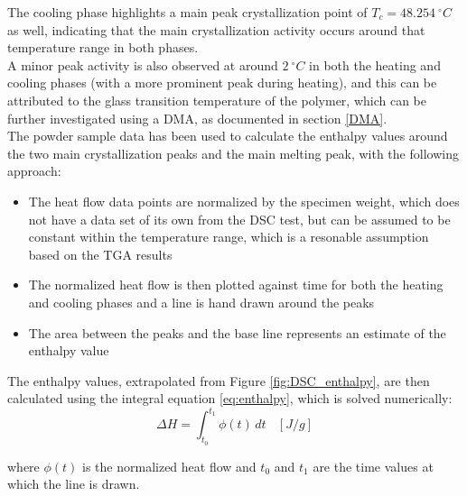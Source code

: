 \documentclass[a4paper]{article}
\begin{document}
        The cooling phase highlights a main peak crystallization point of $T_{c} =  48.254 \ ^{\circ}C$ as well, indicating 
        that the main crystallization activity occurs around that temperature range in both phases. \\ 

        A minor peak activity is also observed at around $2 \ ^{\circ}C$ in both the heating and cooling phases
        (with a more prominent peak during heating), and this can be attributed to the
        glass transition temperature of the polymer, which can be further investigated using a DMA, as documented in section \ref{DMA}. \\

        The powder sample data has been used to calculate the enthalpy values around the two main crystallization peaks and the main 
        melting peak, with the following approach: \\

        \begin{itemize}
            \item The heat flow data points are normalized by the specimen weight, which does not have a data set of its own from the DSC test, 
            but can be assumed to be constant within the temperature range, which is a resonable 
            assumption based on the TGA results 
            \item The normalized heat flow is then plotted against time for both the heating and cooling phases and 
            a line is hand drawn around the peaks
            \item The area between the peaks and the base line represents an estimate of the enthalpy value  
        \end{itemize}

        The enthalpy values, extrapolated from Figure \ref{fig:DSC_enthalpy}, are then calculated using the integral equation \ref{eq:enthalpy}, which is solved numerically: \\ 

        \begin{equation}
            \Delta H = \int_{t_0}^{t_1} \phi (t) \,dt \ \ \ \ [J/g]
            \label{eq:enthalpy}
        \end{equation}

        where $\phi (t)$ is the normalized heat flow and $t_0$ and $t_1$ are the time values at which the line is drawn. 

        \clearpage
\end{document}
